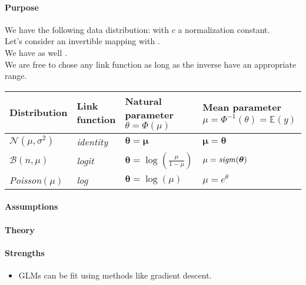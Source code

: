 \paragraph{Purpose}
We have the following data distribution:
with $c$ a normalization constant.\\
Let's consider an invertible mapping  with
.\\
We have as well .\\
We are free to chose any link function as long as the inverse have an appropriate 
range. 

\begin{center}
    \begin{tabular}{|*{4}{l|}}
    \hline
    \textbf{Distribution} & \textbf{Link function}  & 
    \textbf{Natural parameter} $\theta = \Phi(\mu)$ & \textbf{Mean parameter} $\mu = 
    \Phi^{-1}(\theta) = \mathbb{E}(y)$ \\
    \hline
    $\mathcal{N}(\mu, \sigma^{2})$ & \emph{identity} & $\bm{\theta} = \bm{\mu}$ & 
    $\bm{\mu} = \bm{\theta}$\\
    \hline
    $\mathcal{B}(n,\mu)$ & \emph{logit} & $\bm{\theta} = \log\left(\frac{\mu}{1-\mu}
    \right)$ & $\mu = \text{\emph{sigm}}(\bm{\theta})$\\
    \hline
    \emph{Poisson}$(\mu)$ & \emph{log} & $\bm{\theta} = \log\left(\mu\right)$ & 
    $\mu=e^{\theta}$\\
    \hline
    \end{tabular}
\end{center}

\paragraph{Assumptions}
\paragraph{Theory}
\paragraph{Strengths}
\begin{itemize}
    \item GLMs can be fit using methods like gradient descent.
\end{itemize}

